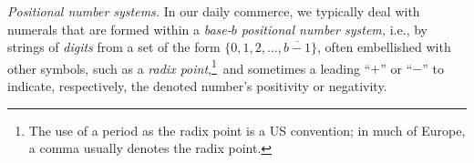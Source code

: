 \noindent
{\it Positional number systems.}
%
In our daily commerce, we typically deal with numerals that are formed
within a {\it base-$b$ positional number system,}
%
i.e., by strings of {\it digits} from a set of the form $\{0, 1, 2,
\ldots, \overline{b-1}\}$, often embellished with other symbols, such as
a {\em radix point},\footnote{The use of a period as the radix point
  is a US convention; in much of Europe, a comma usually denotes the
  radix point.}~and sometimes a leading ``$+$'' or ``$-$'' to
indicate, respectively, the denoted number's positivity or negativity.
\medskip

\noindent {}
\medskip

